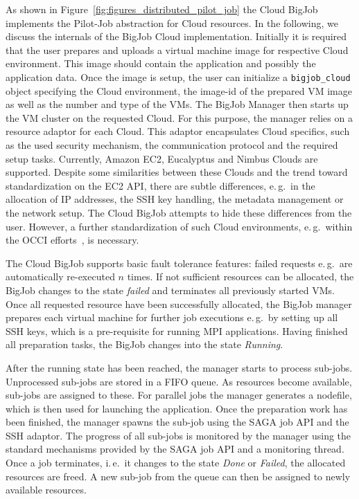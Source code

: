 \documentclass[conference,final]{IEEEtran}
\begin{document}
As shown in Figure~\ref{fig:figures_distributed_pilot_job} the Cloud BigJob implements
the Pilot-Job abstraction for Cloud resources. In the following, we discuss
the internals of the BigJob Cloud implementation. Initially it is required that the user
prepares and uploads a virtual machine image for respective Cloud environment. 
This image should contain the application and possibly the
application data. Once the image is setup, the user can initialize a
\texttt{bigjob\_cloud} object specifying the Cloud environment, 
the image-id of the prepared VM image as well as the number and type of the VMs. The 
BigJob Manager then starts up the VM cluster on the requested Cloud. 
For this purpose, the manager relies on a resource adaptor
for each Cloud. This adaptor encapsulates Cloud specifics, such as the used
security mechanism, the communication protocol and the required setup tasks. Currently,
Amazon EC2, Eucalyptus and Nimbus Clouds are supported. Despite some similarities
between these Clouds and the trend toward standardization on the
EC2 API, there are subtle differences, e.\,g.\ in the allocation
of IP addresses, the SSH key handling, the metadata management or 
the network setup. The Cloud BigJob attempts to hide these differences 
from the user. However, a further standardization of such Cloud environments, 
e.\,g.\ within the OCCI efforts~\cite{occi}, is necessary.

The Cloud BigJob supports basic fault tolerance features: failed requests e.\,g.\
are automatically re-executed $n$ times. If not sufficient resources can be
allocated, the BigJob changes to the state \emph{failed} and terminates all previously
started VMs. Once all requested resource have been successfully allocated, the BigJob manager
prepares each virtual machine for further job executions e.\,g.\ by setting
up all SSH keys, which is a pre-requisite for running MPI applications.
Having finished all preparation tasks, the BigJob changes into the state
\emph{Running}. 

After the running state has been reached, the manager starts to process sub-jobs.
Unprocessed sub-jobs are stored in a FIFO queue. As resources become available,
sub-jobs are assigned to these. For parallel jobs the manager generates
a nodefile, which is then used for launching the application. Once the preparation
work has been finished, the manager spawns the sub-job using the SAGA job API and the SSH
adaptor. The progress of all sub-jobs is monitored by the manager using the standard mechanisms 
provided by the SAGA job API and a monitoring thread. Once a job terminates, i.\,e.\ it changes 
to the state \emph{Done} or \emph{Failed}, the allocated resources are freed. 
A new sub-job from the queue can then be assigned to newly available resources.
\end{document}
